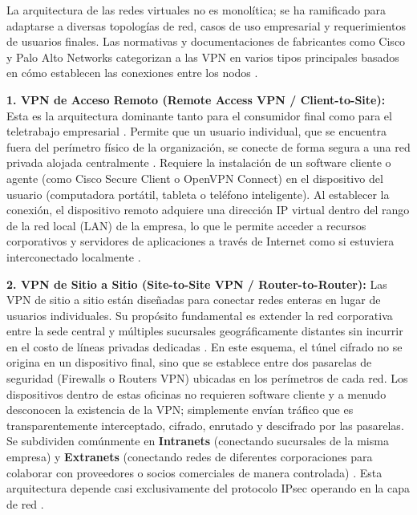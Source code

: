 \documentclass[a4paper,12pt]{article}
\begin{document}
La arquitectura de las redes virtuales no es monolítica; se ha ramificado para adaptarse a diversas topologías de red, casos de uso empresarial y requerimientos de usuarios finales. Las normativas y documentaciones de fabricantes como Cisco y Palo Alto Networks categorizan a las VPN en varios tipos principales basados en cómo establecen las conexiones entre los nodos \cite{paloalto_types, cisco_vpn_types}.

\textbf{1. VPN de Acceso Remoto (Remote Access VPN / Client-to-Site):}
Esta es la arquitectura dominante tanto para el consumidor final como para el teletrabajo empresarial \cite{fortinet_remote}. Permite que un usuario individual, que se encuentra fuera del perímetro físico de la organización, se conecte de forma segura a una red privada alojada centralmente \cite{aws_vpn, paloalto_types}. Requiere la instalación de un software cliente o agente (como Cisco Secure Client o OpenVPN Connect) en el dispositivo del usuario (computadora portátil, tableta o teléfono inteligente). Al establecer la conexión, el dispositivo remoto adquiere una dirección IP virtual dentro del rango de la red local (LAN) de la empresa, lo que le permite acceder a recursos corporativos y servidores de aplicaciones a través de Internet como si estuviera interconectado localmente \cite{cloudflare_business}. 

\textbf{2. VPN de Sitio a Sitio (Site-to-Site VPN / Router-to-Router):}
Las VPN de sitio a sitio están diseñadas para conectar redes enteras en lugar de usuarios individuales. Su propósito fundamental es extender la red corporativa entre la sede central y múltiples sucursales geográficamente distantes sin incurrir en el costo de líneas privadas dedicadas \cite{cisco_vpn_types, paloalto_site}. En este esquema, el túnel cifrado no se origina en un dispositivo final, sino que se establece entre dos pasarelas de seguridad (Firewalls o Routers VPN) ubicadas en los perímetros de cada red. Los dispositivos dentro de estas oficinas no requieren software cliente y a menudo desconocen la existencia de la VPN; simplemente envían tráfico que es transparentemente interceptado, cifrado, enrutado y descifrado por las pasarelas. Se subdividen comúnmente en \textbf{Intranets} (conectando sucursales de la misma empresa) y \textbf{Extranets} (conectando redes de diferentes corporaciones para colaborar con proveedores o socios comerciales de manera controlada) \cite{cisco_vpn_types}. Esta arquitectura depende casi exclusivamente del protocolo IPsec operando en la capa de red \cite{checkpoint_ipsec}.
\end{document}
